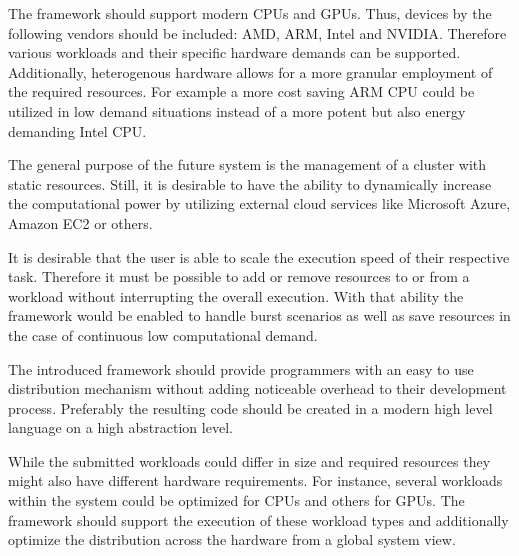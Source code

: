 \begin{description}[style=nextline]
    \item [Heterogeneity]
    The framework should support modern CPUs and GPUs. Thus, devices by the following vendors should be included: AMD, ARM, Intel and NVIDIA. Therefore various workloads and their specific hardware demands can be supported. Additionally, heterogenous hardware allows for a more granular employment of the required resources. For example a more cost saving ARM CPU could be utilized in low demand situations instead of a more potent but also energy demanding Intel CPU.

    \item [Resource Scalability]
    The general purpose of the future system is the management of a cluster with static resources. Still, it is desirable to have the ability to dynamically increase the computational power by utilizing external cloud services like Microsoft Azure, Amazon EC2 or others.

    \item [Scalable Speed]
    It is desirable that the user is able to scale the execution speed of their respective task. Therefore it must be possible to add or remove resources to or from a workload without interrupting the overall execution. With that ability the framework would be enabled to handle burst scenarios as well as save resources in the case of continuous low computational demand.
    
    \item [Ease of Programming]
    The introduced framework should provide programmers with an easy to use distribution mechanism without adding noticeable overhead to their development process. Preferably the resulting code should be created in a modern high level language on a high abstraction level.

    \item [Workload Diversity]
    While the submitted workloads could differ in size and required resources they might also have different hardware requirements. For instance, several workloads within the system could be optimized for CPUs and others for GPUs. The framework should support the execution of these workload types and additionally optimize the distribution across the hardware from a global system view.  
    
\end{description}

